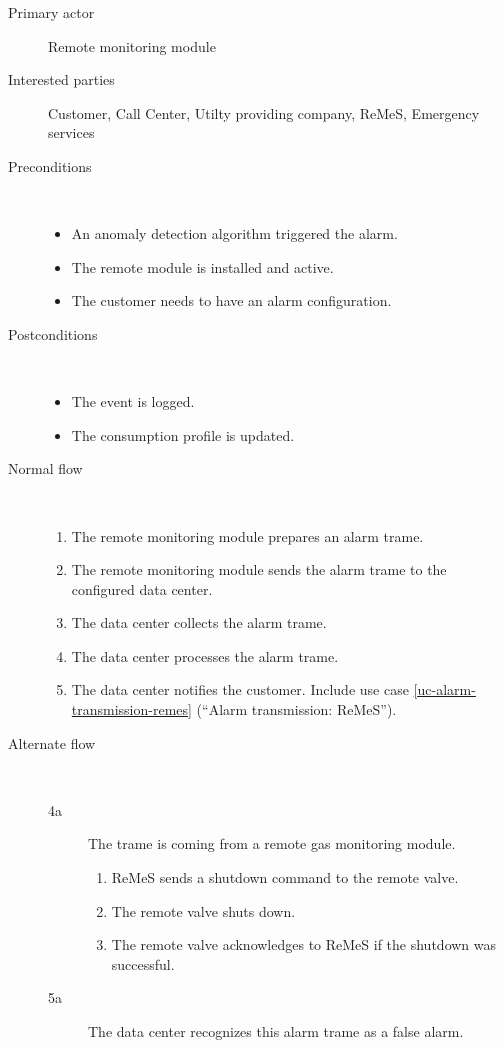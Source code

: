 \begin{description}
	\item[Primary actor] Remote monitoring module
	\item[Interested parties] Customer, Call Center, Utilty providing company,
	ReMeS, Emergency services
	\item[Preconditions] \ 
	\begin{itemize}
	  	\item An anomaly detection algorithm triggered the alarm.
		\item The remote module is installed and active.
		\item The customer needs to have an alarm configuration.
	\end{itemize}
	\item[Postconditions] \ 
	\begin{itemize}
		\item The event is logged.
		\item The consumption profile is updated.
	\end{itemize}
	\item[Normal flow] \ 
	\begin{enumerate}
	  	\item The remote monitoring module prepares an alarm trame.
	  	\item The remote monitoring module sends the alarm trame to the configured
	  	data center. 
	  	\item The data center collects the alarm trame.
	  	\item The data center processes the alarm trame.
	  	\item The data center notifies the customer. Include use case
	  	\ref{uc-alarm-transmission-remes} (``Alarm transmission: ReMeS'').
	\end{enumerate}
	\item[Alternate flow] \ 
	\begin{description}
		\item[4a] The trame is coming from a remote gas monitoring module.
			\begin{enumerate}
				\item ReMeS sends a shutdown command to the remote valve.
				\item The remote valve shuts down.
				\item The remote valve acknowledges to ReMeS if the shutdown was successful.
			\end{enumerate}
		\item[5a] The data center recognizes this alarm trame as a false alarm.

\end{description}
\end{description}
